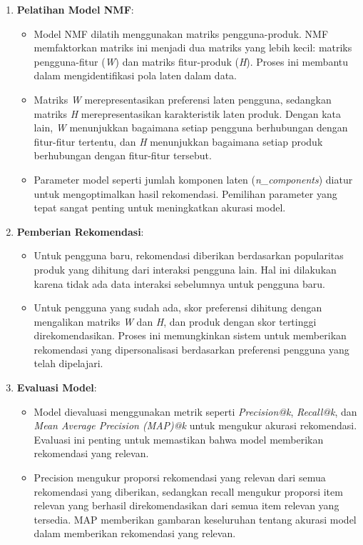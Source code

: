 \documentclass[journal,article,submit,pdftex,moreauthors]{Definitions/mdpi}
\begin{document}
\begin{enumerate}
    \item \textbf{Pelatihan Model NMF}:
    \begin{itemize}
        \item Model NMF dilatih menggunakan matriks pengguna-produk. NMF memfaktorkan matriks ini menjadi dua matriks yang lebih kecil: matriks pengguna-fitur (\textit{W}) dan matriks fitur-produk (\textit{H}). Proses ini membantu dalam mengidentifikasi pola laten dalam data.
        \item Matriks \textit{W} merepresentasikan preferensi laten pengguna, sedangkan matriks \textit{H} merepresentasikan karakteristik laten produk. Dengan kata lain, \textit{W} menunjukkan bagaimana setiap pengguna berhubungan dengan fitur-fitur tertentu, dan \textit{H} menunjukkan bagaimana setiap produk berhubungan dengan fitur-fitur tersebut.
        \item Parameter model seperti jumlah komponen laten (\textit{n\_components}) diatur untuk mengoptimalkan hasil rekomendasi. Pemilihan parameter yang tepat sangat penting untuk meningkatkan akurasi model.
    \end{itemize}

    \item \textbf{Pemberian Rekomendasi}:
    \begin{itemize}
        \item Untuk pengguna baru, rekomendasi diberikan berdasarkan popularitas produk yang dihitung dari interaksi pengguna lain. Hal ini dilakukan karena tidak ada data interaksi sebelumnya untuk pengguna baru.
        \item Untuk pengguna yang sudah ada, skor preferensi dihitung dengan mengalikan matriks \textit{W} dan \textit{H}, dan produk dengan skor tertinggi direkomendasikan. Proses ini memungkinkan sistem untuk memberikan rekomendasi yang dipersonalisasi berdasarkan preferensi pengguna yang telah dipelajari.
    \end{itemize}

    \item \textbf{Evaluasi Model}:
    \begin{itemize}
        \item Model dievaluasi menggunakan metrik seperti \textit{Precision@k}, \textit{Recall@k}, dan \textit{Mean Average Precision (MAP)@k} untuk mengukur akurasi rekomendasi. Evaluasi ini penting untuk memastikan bahwa model memberikan rekomendasi yang relevan.
        \item Precision mengukur proporsi rekomendasi yang relevan dari semua rekomendasi yang diberikan, sedangkan recall mengukur proporsi item relevan yang berhasil direkomendasikan dari semua item relevan yang tersedia. MAP memberikan gambaran keseluruhan tentang akurasi model dalam memberikan rekomendasi yang relevan.
    \end{itemize}
\end{enumerate}
\end{document}
